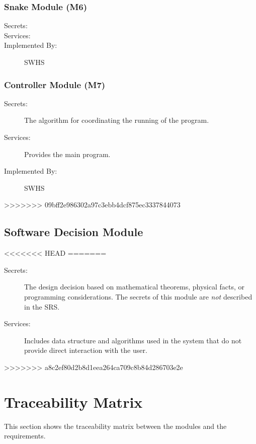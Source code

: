 \documentclass[12pt]{article}
\begin{document}
\subsubsection{Snake Module (M6)}

\begin{description}
\item[Secrets:] 
\item[Services:] 
\item[Implemented By:] SWHS
\end{description}

\subsubsection{Controller Module (M7)}

\begin{description}
\item[Secrets:] The algorithm for coordinating the running of the program.
\item[Services:] Provides the main program.
\item[Implemented By:] SWHS
\end{description}
>>>>>>> 09bff2e986302a97c3ebb4dcf875ec3337844073

\subsection{Software Decision Module}

<<<<<<< HEAD
=======
\begin{description}
\item[Secrets:] The design decision based on mathematical theorems, physical
  facts, or programming considerations. The secrets of this module are
  \emph{not} described in the SRS.
\item[Services:] Includes data structure and algorithms used in the system that
  do not provide direct interaction with the user. 

\end{description}

>>>>>>> a8c2ef80d2b8d1eea264ca709c8b84d286703e2e
\section{Traceability Matrix} \label{SecTM}

This section shows the traceability matrix between the modules and the
requirements.
\end{document}
